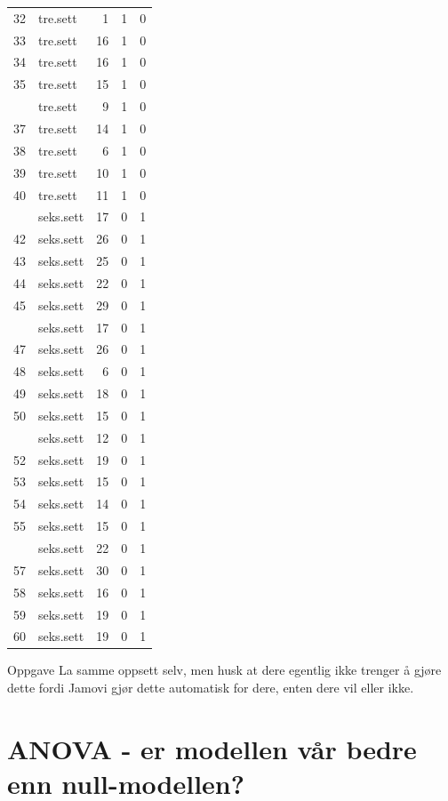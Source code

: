 \documentclass[
]{book}
\begin{document}
\begin{table}
\begin{tabular}[t]{rlrrr}
32 & tre.sett & 1 & 1 & 0\\
33 & tre.sett & 16 & 1 & 0\\
34 & tre.sett & 16 & 1 & 0\\
35 & tre.sett & 15 & 1 & 0\\
\addlinespace
36 & tre.sett & 9 & 1 & 0\\
37 & tre.sett & 14 & 1 & 0\\
38 & tre.sett & 6 & 1 & 0\\
39 & tre.sett & 10 & 1 & 0\\
40 & tre.sett & 11 & 1 & 0\\
\addlinespace
41 & seks.sett & 17 & 0 & 1\\
42 & seks.sett & 26 & 0 & 1\\
43 & seks.sett & 25 & 0 & 1\\
44 & seks.sett & 22 & 0 & 1\\
45 & seks.sett & 29 & 0 & 1\\
\addlinespace
46 & seks.sett & 17 & 0 & 1\\
47 & seks.sett & 26 & 0 & 1\\
48 & seks.sett & 6 & 0 & 1\\
49 & seks.sett & 18 & 0 & 1\\
50 & seks.sett & 15 & 0 & 1\\
\addlinespace
51 & seks.sett & 12 & 0 & 1\\
52 & seks.sett & 19 & 0 & 1\\
53 & seks.sett & 15 & 0 & 1\\
54 & seks.sett & 14 & 0 & 1\\
55 & seks.sett & 15 & 0 & 1\\
\addlinespace
56 & seks.sett & 22 & 0 & 1\\
57 & seks.sett & 30 & 0 & 1\\
58 & seks.sett & 16 & 0 & 1\\
59 & seks.sett & 19 & 0 & 1\\
60 & seks.sett & 19 & 0 & 1\\
\bottomrule
\end{tabular}
\end{table}

{Oppgave}
La samme oppsett selv, men husk at dere egentlig ikke trenger å gjøre dette fordi Jamovi gjør dette automatisk for dere, enten dere vil eller ikke.

\hypertarget{anova---er-modellen-vuxe5r-bedre-enn-null-modellen}{%
\section{ANOVA - er modellen vår bedre enn null-modellen?}\label{anova---er-modellen-vuxe5r-bedre-enn-null-modellen}}
\end{document}

